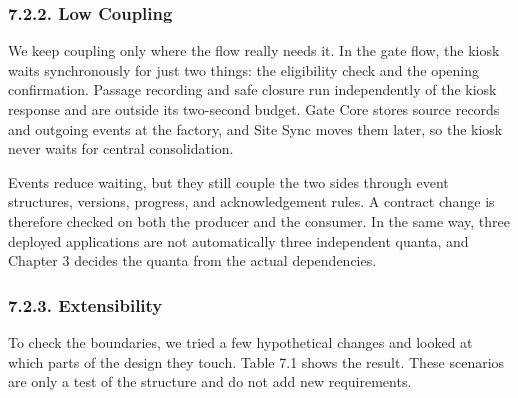 \subsubsection*{7.2.2. Low Coupling}

{}

We keep coupling only where the flow really needs it. In the gate flow, the kiosk waits synchronously for just two things: the eligibility check and the opening confirmation. Passage recording and safe closure run independently of the kiosk response and are outside its two-second budget. Gate Core stores source records and outgoing events at the factory, and Site Sync moves them later, so the kiosk never waits for central consolidation.

Events reduce waiting, but they still couple the two sides through event structures, versions, progress, and acknowledgement rules. A contract change is therefore checked on both the producer and the consumer. In the same way, three deployed applications are not automatically three independent quanta, and Chapter 3 decides the quanta from the actual dependencies.

\subsubsection*{7.2.3. Extensibility}

{}

To check the boundaries, we tried a few hypothetical changes and looked at which parts of the design they touch. Table 7.1 shows the result. These scenarios are only a test of the structure and do not add new requirements.


